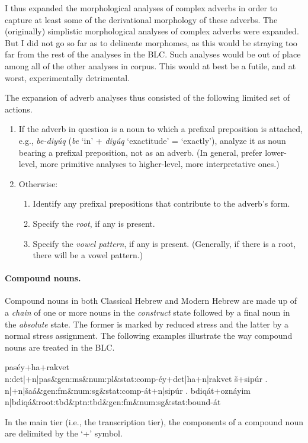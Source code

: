 I thus expanded the morphological analyses of complex adverbs in order to capture at 
least some of the derivational morphology of these adverbs.
The (originally) simplistic morphological analyses of complex adverbs were expanded.
But I did not go so far as to delineate morphomes, as this would 
be straying too far from the rest of the analyses in the \ac{BLC}. Such 
analyses would be out of place among all of the other analyses in corpus. 
This would at best be a futile, and at worst, experimentally detrimental.

The expansion of adverb analyses thus consisted of the following limited set of actions. 
\begin{enumerate}
\item If the adverb in question is a noun to which a prefixal preposition is attached, e.g., \textit{be-diy\'uq} (\textit{be} `in' + \textit{diy\'uq} `exactitude' = `exactly'),  %
analyze it as noun bearing a prefixal preposition, not as an adverb. (In general, prefer lower-level, more primitive analyses to higher-level,
more interpretative ones.) 
\item Otherwise: %
    \begin{enumerate}
        \item Identify any prefixal prepositions that contribute to the adverb's form.
        \item Specify the \emph{root}, if any is present.
        \item Specify the \emph{vowel pattern}, if any is present. (Generally, if there is a root, there will be a vowel pattern.) 
    \end{enumerate}
\end{enumerate}

\paragraph{Compound nouns.}
Compound nouns in both Classical Hebrew and Modern Hebrew are made up of a \emph{chain} of 
one or more nouns in the \emph{construct} state followed by a final noun
in the \emph{absolute} state. The former is marked by reduced stress 
and the latter by a normal stress assignment. The following examples 
illustrate the way compound nouns are treated in the \ac{BLC}.
\begin{exe}
\ex \label{ex:cstr:pasey}
	\textsf{pas\'{e}y+ha+rakvet} \\
	\textsf{n:det|+n|pas\&gen:ms\&num:pl\&stat:comp-\'{e}y+det|ha+n|rakvet}
\ex \label{ex:cstr:shaat} 
	\textsf{\v{s}+sip\'{u}r .} \\
	\textsf{n|+n|\v{s}a\'a\&gen:fm\&num:sg\&stat:comp-\'at+n|sip\'ur .}
\ex \label{ex:cstr:bdiqat} 
	\textsf{bdiq\'{a}t+ozn\'{a}yim} \\ 
	\textsf{n|bdiq\'{a}\&root:tbd\&ptn:tbd\&gen:fm\&num:sg\&stat:bound-\'{a}t}
\end{exe}
In the main tier (i.e., the transcription tier), the components of a compound noun are
delimited by the `+' symbol. 

